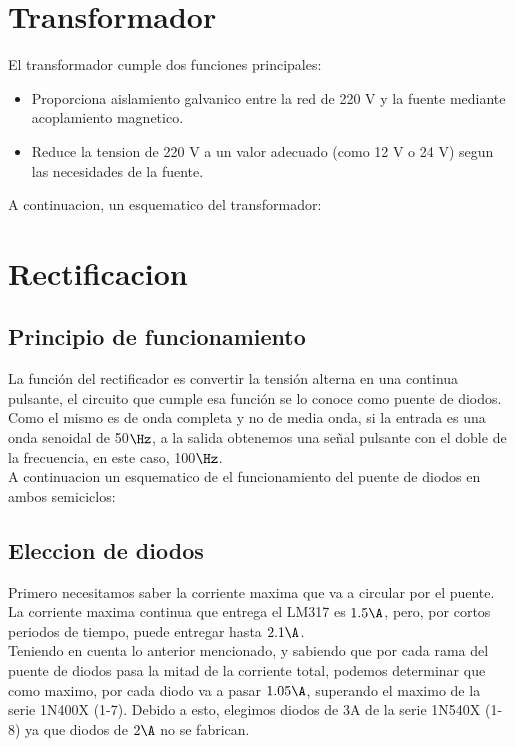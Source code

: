 \documentclass[chaptersright]{informeutn}
\begin{document}
      \section{Transformador}
        El transformador cumple dos funciones principales:
        \begin{itemize}
          \item Proporciona aislamiento galvanico entre la red de 220 V y la fuente mediante acoplamiento magnetico.
          \item Reduce la tension de 220 V a un valor adecuado (como 12 V o 24 V) segun las necesidades de la fuente.
        \end{itemize}
        A continuacion, un esquematico del transformador:
        


      \section{Rectificacion}
        \subsection{Principio de funcionamiento}
          La función del rectificador es convertir la tensión alterna en una continua pulsante, el circuito que cumple 
          esa función se lo conoce como puente de diodos. Como el mismo es de onda completa y no de media onda, si la 
          entrada es una onda senoidal de 50$\Hz$, a la salida obtenemos una señal pulsante con el doble de la 
          frecuencia, en este caso, 100$\Hz$.\\ 
          A continuacion un esquematico de el funcionamiento del puente de diodos en ambos semiciclos:
        \subsection{Eleccion de diodos}
          Primero necesitamos saber la corriente maxima que va a circular por el puente. La corriente maxima continua
          que entrega el LM317 es $1.5\A$, pero, por cortos periodos de tiempo, puede entregar hasta $2.1\A$.\\
          Teniendo en cuenta lo anterior mencionado, y sabiendo que por cada rama del puente de diodos pasa la mitad de
          la corriente total, podemos determinar que como maximo, por cada diodo va a pasar $1.05\A$, superando el
          maximo de la serie 1N400X (1-7). Debido a esto, elegimos diodos de 3A de la serie 1N540X (1-8) ya que diodos
          de $2\A$ no se fabrican.
\end{document}
